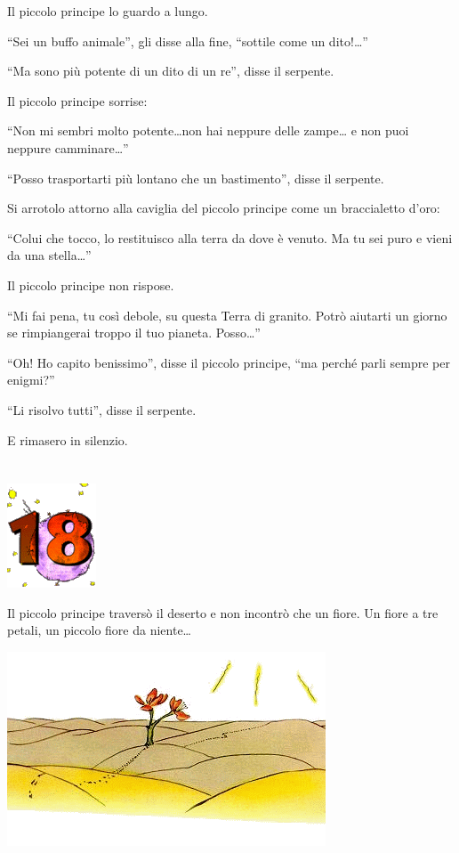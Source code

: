 \documentclass[11pt]{scrbook}
\begin{document}
Il piccolo principe lo guardo a lungo.

``Sei un buffo animale'', gli disse alla fine, ``sottile come un dito!\ldots{}''

``Ma sono più potente di un dito di un re'', disse il serpente.

Il piccolo principe sorrise:

``Non mi sembri molto potente\ldots{}non hai neppure delle zampe\ldots{} e non puoi neppure camminare\ldots{}''

``Posso trasportarti più lontano che un bastimento'', disse il serpente.

Si arrotolo attorno alla caviglia del piccolo principe come un braccialetto d'oro:

``Colui che tocco, lo restituisco alla terra da dove è venuto. Ma tu sei puro e vieni da una stella\ldots{}''

Il piccolo principe non rispose.

``Mi fai pena, tu così debole, su questa Terra di granito. Potrò aiutarti un giorno se rimpiangerai troppo il tuo pianeta. Posso\ldots{}''

``Oh! Ho capito benissimo'', disse il piccolo principe, ``ma perché parli sempre per enigmi?''

``Li risolvo tutti'', disse il serpente.

E rimasero in silenzio.

\chapter{}
\begin{center}
\includegraphics{img/chapter18}
\end{center}

Il piccolo principe traversò il deserto e non incontrò che un fiore. Un fiore a tre petali, un piccolo fiore da niente\ldots{}

\begin{center}
\includegraphics{img/18a}
\end{center}
\end{document}
